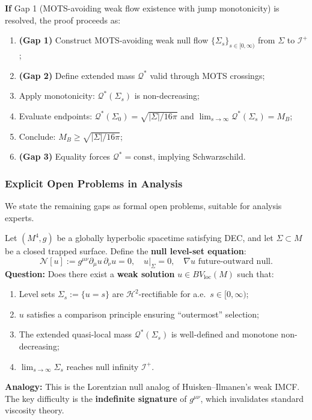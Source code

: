 \textbf{If} Gap 1 (MOTS-avoiding weak flow existence with jump monotonicity) is resolved, the proof proceeds as:
\begin{enumerate}
\item \textbf{(Gap 1)} Construct MOTS-avoiding weak null flow $\{\Sigma_s\}_{s \in [0, \infty)}$ from $\Sigma$ to $\mathscr{I}^+$;
\item \textbf{(Gap 2)} Define extended mass $\mathcal{Q}^*$ valid through MOTS crossings;
\item Apply monotonicity: $\mathcal{Q}^*(\Sigma_s)$ is non-decreasing;
\item Evaluate endpoints: $\mathcal{Q}^*(\Sigma_0) = \sqrt{|\Sigma|/16\pi}$ and $\lim_{s \to \infty} \mathcal{Q}^*(\Sigma_s) = M_B$;
\item Conclude: $M_B \geq \sqrt{|\Sigma|/16\pi}$;
\item \textbf{(Gap 3)} Equality forces $\mathcal{Q}^* = \text{const}$, implying Schwarzschild.
\end{enumerate}

\subsubsection{Explicit Open Problems in Analysis}

We state the remaining gaps as formal open problems, suitable for analysis experts.

\begin{openproblem}
\label{op:null-level-set}
Let $(M^4, g)$ be a globally hyperbolic spacetime satisfying DEC, and let $\Sigma \subset M$ be a closed trapped surface. Define the \textbf{null level-set equation}:
\begin{equation}
\mathcal{N}[u] := g^{\mu\nu} \partial_\mu u \, \partial_\nu u = 0, \quad u|_\Sigma = 0, \quad \nabla u \text{ future-outward null}.
\end{equation}
\textbf{Question:} Does there exist a \textbf{weak solution} $u \in BV_{\mathrm{loc}}(M)$ such that:
\begin{enumerate}[label=(\roman*)]
\item Level sets $\Sigma_s := \{u = s\}$ are $\mathcal{H}^2$-rectifiable for a.e.\ $s \in [0, \infty)$;
\item $u$ satisfies a comparison principle ensuring ``outermost'' selection;
\item The extended quasi-local mass $\mathcal{Q}^*(\Sigma_s)$ is well-defined and monotone non-decreasing;
\item $\lim_{s \to \infty} \Sigma_s$ reaches null infinity $\mathscr{I}^+$.
\end{enumerate}
\textbf{Analogy:} This is the Lorentzian null analog of Huisken--Ilmanen's weak IMCF. The key difficulty is the \textbf{indefinite signature} of $g^{\mu\nu}$, which invalidates standard viscosity theory.
\end{openproblem}

